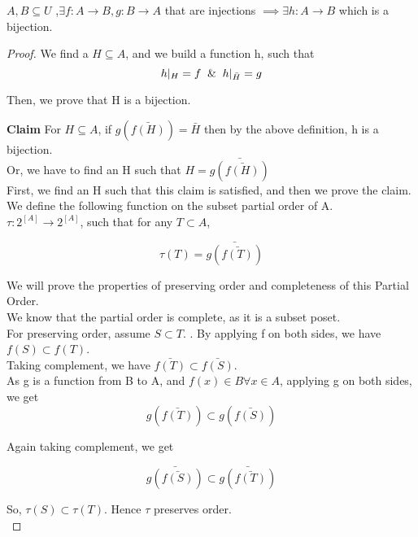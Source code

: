 \begin{theorem}
$A,B \subseteq U$ ,$\exists f:A \to B, g:B \to A$ that are injections $\implies \exists h:A \to B$ which is a bijection.
\end{theorem}

\begin{proof}

We find a $H \subseteq A$, and we build a function h, such that
$$ h |_H = f \And h|_{\bar H} = g $$

Then, we prove that H is a bijection.

\textbf{Claim} For $H \subseteq A$, if $g( \bar{f(H)} ) = \bar H$ then by  the above definition, h is a bijection. \\

Or, we have to find an H such that $H = \bar{g(\bar{f(H)})}$ \\


First, we find an H such that this claim is satisfied, and then we prove the claim. \\

We define the following function on the subset partial order of A.\\

$\tau : 2^{[A]} \to 2^{[A]}$, such that for any $T \subset A$,

$$ \tau(T) = \bar{g(\bar{f(T)})}$$

We will prove the properties of preserving order and completeness of this Partial Order. \\

We know that the partial order is complete, as it is a subset poset. \\

For preserving order, assume $S \subset T$. . By applying f on both sides, we have $f(S) \subset f(T)$. \\

Taking complement, we have $\bar{f(T)} \subset \bar{f(S)}$.\\

As g is a function from B to A, and $f(x) \in B \forall x \in A$, applying g on both sides, we get \\

$$ g(\bar{f(T)}) \subset g(\bar{f(S)})$$

Again taking complement, we get 

$$ \bar{g(\bar{f(S)})} \subset \bar{g(\bar{f(T)})} $$

So, $\tau(S) \subset \tau(T)$. Hence $\tau$ preserves order.\\


\end{proof}
